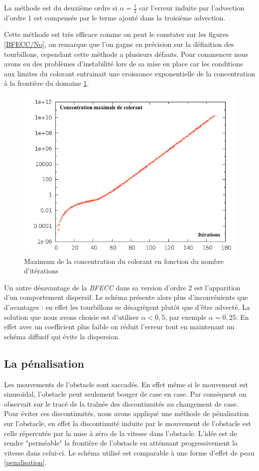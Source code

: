 		La méthode est du deuxième ordre si $\alpha = \frac{1}{2} $ car l'erreur induite par l'advection d'ordre 1 est compensée par le terme ajouté dans la troisième advection.
		
		Cette méthode est très efficace comme on peut le constater sur les figures \ref{BFECC/No}, on remarque que l'on gagne en précision sur la définition des tourbillons, cependant cette méthode a plusieurs défauts. Pour commencer nous avons eu des problèmes d'instabilité lors de sa mise en place car les conditions aux limites du colorant entrainait une croissance exponentielle de la concentration à la frontière du domaine \ref{instabilite}.
		
		\begin{figure}
			\begin{center}
			\includegraphics[width=0.7 \textwidth]{instabilite.png}
			\caption{Maximum de la concentration du colorant en fonction du nombre d'itérations}
			\label{instabilite}
			\end{center}
		\end{figure}
		
		Un autre désavantage de la \emph{BFECC} dans sa version d'ordre 2 est l'apparition d'un comportement dispersif. Le schéma présente alors plus d'inconvénients que d'avantages : en effet les tourbillons se désagrègent plutôt que d'être advecté. La solution que nous avons choisie est d'utiliser $\alpha < 0,5$, par exemple $\alpha = 0,25$. En effet avec un coefficient plus faible on réduit l'erreur tout en maintenant un schéma diffusif qui évite la dispersion.
	
	\subsection{La pénalisation}

		Les mouvements de l'obstacle sont saccadés. En effet même si le mouvement est sinusoïdal, l'obstacle peut seulement bouger de case en case. Par conséquent on observait sur le tracé de la traînée des discontiunités au changement de case. Pour éviter ces discontinuités, nous avons appliqué une méthode de pénalisation sur l'obstacle, en effet la discontinuité induite par le mouvement de l'obstacle est celle répercutée par la mise à zéro de la vitesse dans l'obstacle. L'idée est de rendre "perméable" la frontière de l'obstacle en atténuant progressivement la vitesse dans celui-ci. Le schéma utilisé est comparable à une forme d'effet de peau \eqref{penalisation}. 
		
